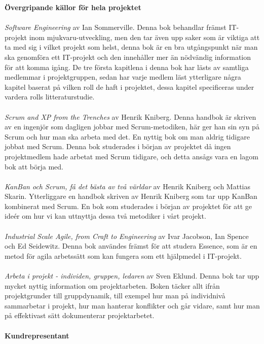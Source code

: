 \documentclass[conference]{IEEEtran}
\begin{document}
\textbf{Övergripande källor för hela projektet}\\
\\
\textit{Software Engineering} av Ian Sommerville\cite{Sommerville10}. Denna bok behandlar främst IT-projekt inom mjukvaru-utveckling, men den tar även upp saker som är viktiga att ta med sig i vilket projekt som helst, denna bok är en bra utgångspunkt när man ska genomföra ett IT-projekt och den innehåller mer än nödvändig information för att komma igång. De tre första kapitlena i denna bok har lästs av samtliga medlemmar i projektgruppen, sedan har varje medlem läst ytterligare några kapitel baserat på vilken roll de haft i projektet, dessa kapitel specificeras under vardera rolls litteraturstudie.\\
\\
\textit{Scrum and XP from the Trenches} av Henrik Kniberg\cite{Kniberg07}. Denna handbok är skriven av en ingenjör som dagligen jobbar med Scrum-metodiken, här ger han sin syn på Scrum och hur man ska arbeta med det. En nyttig bok om man aldrig tidigare jobbat med Scrum. Denna bok studerades i början av projektet då ingen projektmedlem hade arbetat med Scrum tidigare, och detta ansågs vara en lagom bok att börja med.\\
\\
\textit{KanBan och Scrum, få det bästa av två världar} av Henrik Kniberg och Mattias Skarin\cite{Kniberg10}. Ytterliggare en handbok skriven av Henrik Kniberg som tar upp KanBan kombinerat med Scrum. En bok som studerades i början av projektet för att ge ideér om hur vi kan uttnyttja dessa två metodiker i vårt projekt.\\
\\
\textit{Industrial Scale Agile, from Craft to Engineering} av Ivar Jacobson, Ian Spence och Ed Seidewitz\cite{Jacobson16}. Denna bok användes främst för att studera Essence, som är en metod för agila arbetssätt som kan fungera som ett hjälpmedel i IT-projekt.\\
\\
\textit{Arbeta i projekt - individen, gruppen, ledaren} av Sven Eklund\cite{Eklund14}. Denna bok tar upp mycket nyttig information om projektarbeten. Boken täcker allt ifrån projektgrunder till gruppdynamik, till exempel hur man på individnivå sammarbetar i projekt, hur man hanterar konflikter och går vidare, samt hur man på effektivast sätt dokumenterar projektarbetet.\\
\\
\textbf{Kundrepresentant}\\
\end{document}
